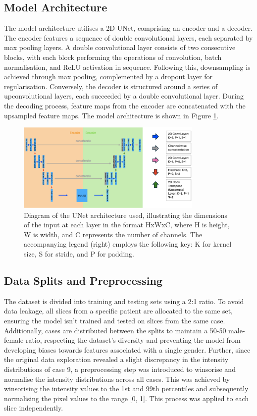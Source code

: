 \documentclass[11pt]{article}
\begin{document}
\subsection{Model Architecture}
The model architecture utilises a 2D UNet, comprising an encoder and a decoder. The encoder features a sequence of double convolutional layers, each separated by max pooling layers. A double convolutional layer consists of two consecutive blocks, with each block performing the operations of convolution, batch normalisation, and ReLU activation in sequence. Following this, downsampling is achieved through max pooling, complemented by a dropout layer for regularisation. Conversely, the decoder is structured around a series of upconvolutional layers, each succeeded by a double convolutional layer. During the decoding process, feature maps from the encoder are concatenated with the upsampled feature maps. The model architecture is shown in Figure \ref{fig:unet}.
\begin{figure}[H]
    \centering
    \includegraphics[width=0.8\textwidth]{figs/unet.png}
    \caption{Diagram of the UNet architecture used, illustrating the dimensions of the input at each layer in the format HxWxC, where H is height, W is width, and C represents the number of channels. The accompanying legend (right) employs the following key: K for kernel size, S for stride, and P for padding.}
    \label{fig:unet}
\end{figure}

\subsection{Data Splits and Preprocessing}
The dataset is divided into training and testing sets using a 2:1 ratio. To avoid data leakage, all slices from a specific patient are allocated to the same set, ensuring the model isn't trained and tested on slices from the same case. Additionally, cases are distributed between the splits to maintain a 50-50 male-female ratio, respecting the dataset's diversity and preventing the model from developing biases towards features associated with a single gender.
Further, since the original data exploration revealed a slight discrepancy in the intensity distributions of case 9, a preprocessing step was introduced to winsorise and normalise the intensity distributions across all cases. This was achieved by winsorising the intensity values to the 1st and 99th percentiles and subsequently normalising the pixel values to the range [0, 1]. This process was applied to each slice independently. 
\end{document}
